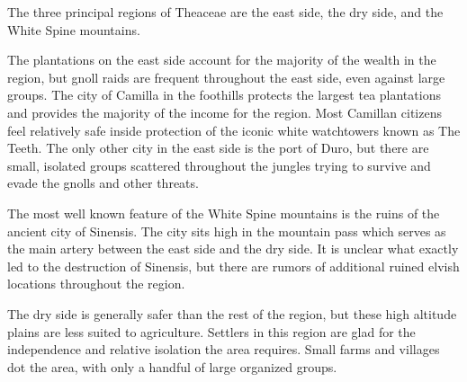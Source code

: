 The three principal regions of Theaceae are the east side, the dry side, and the White Spine mountains.

The plantations on the east side account for the majority of the wealth in the region, but gnoll raids are frequent throughout the east side, even against large groups.
The city of Camilla in the foothills protects the largest tea plantations and provides the majority of the income for the region.
Most Camillan citizens feel relatively safe inside protection of the iconic white watchtowers known as The Teeth.
The only other city in the east side is the port of Duro, but there are small, isolated groups scattered throughout the jungles trying to survive and evade the gnolls and other threats.

The most well known feature of the White Spine mountains is the ruins of the ancient city of Sinensis.
The city sits high in the mountain pass which serves as the main artery between the east side and the dry side.
It is unclear what exactly led to the destruction of Sinensis, but there are rumors of additional ruined elvish locations throughout the region.

The dry side is generally safer than the rest of the region, but these high altitude plains are less suited to agriculture.
Settlers in this region are glad for the independence and relative isolation the area requires.
Small farms and villages dot the area, with only a handful of large organized groups.
